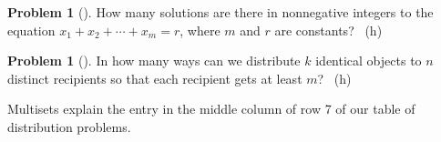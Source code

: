 \documentclass[10pt,]{book}
\theoremstyle{plain}
\theoremstyle{definition}
\newtheorem{activity}[project]{Problem}
\theoremstyle{definition}
\numberwithin{equation}{chapter}
\begin{document}
\begin{activity}[]\marginsymbol[-1em]{} \label{activity-127}
\hypertarget{p-766}{}%
How many solutions are there in nonnegative integers to the equation \(x_1+x_2+ \cdots +x_m = r\), where \(m\) and \(r\) are constants?%
~{\tiny (h)}\end{activity}
\begin{activity}[]\marginsymbol[-1em]{} \label{k-obj-n-recip}
\hypertarget{p-769}{}%
In how many ways can we distribute \(k\) identical objects to \(n\) distinct recipients so that each recipient gets at least \(m\)?%
~{\tiny (h)}\end{activity}
\hypertarget{p-772}{}%
Multisets explain the entry in the middle column of row 7 of our table of distribution problems.%
\typeout{************************************************}
\typeout{************************************************}
\end{document}
